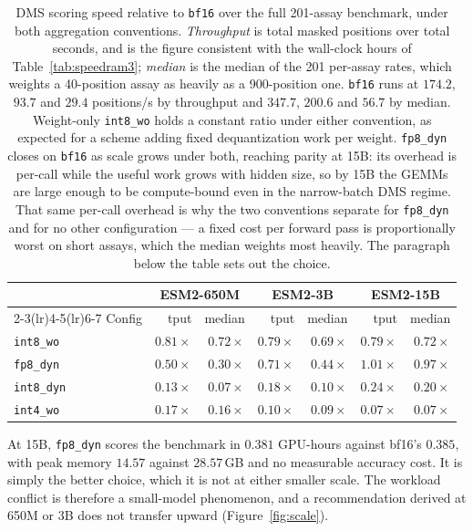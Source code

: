 \documentclass[11pt]{article}
\newcommand{\cfg}[1]{\texttt{#1}}
\begin{document}
\begin{table}[htb]
\centering
\caption{DMS scoring speed relative to \cfg{bf16} over the full 201-assay
benchmark, under both aggregation conventions. \emph{Throughput} is total masked
positions over total seconds, and is the figure consistent with the wall-clock
hours of Table~\ref{tab:speedram3}; \emph{median} is the median of the 201
per-assay rates, which weights a 40-position assay as heavily as a 900-position
one. \cfg{bf16} runs at $174.2$, $93.7$ and $29.4$ positions/s by throughput and
$347.7$, $200.6$ and $56.7$ by median. Weight-only \cfg{int8\_wo} holds a
constant ratio under either convention, as expected for a scheme adding fixed
dequantization work per weight. \cfg{fp8\_dyn} closes on \cfg{bf16} as scale
grows under both, reaching parity at 15B: its overhead is per-call while the
useful work grows with hidden size, so by 15B the GEMMs are large enough to be
compute-bound even in the narrow-batch DMS regime. That same per-call overhead
is why the two conventions separate for \cfg{fp8\_dyn} and for no other
configuration --- a fixed cost per forward pass is proportionally worst on short
assays, which the median weights most heavily. The paragraph below the table
sets out the choice.}
\label{tab:scale}
\small
\begin{tabular}{lrrrrrr}
\toprule
& \multicolumn{2}{c}{ESM2-650M} & \multicolumn{2}{c}{ESM2-3B} & \multicolumn{2}{c}{ESM2-15B} \\
\cmidrule(lr){2-3}\cmidrule(lr){4-5}\cmidrule(lr){6-7}
Config & tput & median & tput & median & tput & median \\
\midrule
\cfg{int8\_wo}  & $0.81\times$ & $0.72\times$ & $0.79\times$ & $0.69\times$ & $0.79\times$ & $0.72\times$ \\
\cfg{fp8\_dyn}  & $0.50\times$ & $0.30\times$ & $0.71\times$ & $0.44\times$ & $\mathbf{1.01\times}$ & $\mathbf{0.97\times}$ \\
\cfg{int8\_dyn} & $0.13\times$ & $0.07\times$ & $0.18\times$ & $0.10\times$ & $0.24\times$ & $0.20\times$ \\
\cfg{int4\_wo}  & $0.17\times$ & $0.16\times$ & $0.10\times$ & $0.09\times$ & $0.07\times$ & $0.07\times$ \\
\bottomrule
\end{tabular}
\end{table}

At 15B, \cfg{fp8\_dyn} scores the benchmark in $0.381$ GPU-hours against bf16's
$0.385$, with peak memory $14.57$ against $28.57$\,GB and no measurable accuracy
cost. It is simply the better choice, which it is not at either smaller scale.
The workload conflict is therefore a small-model phenomenon, and a
recommendation derived at 650M or 3B does not transfer upward
(Figure~\ref{fig:scale}).
\end{document}
